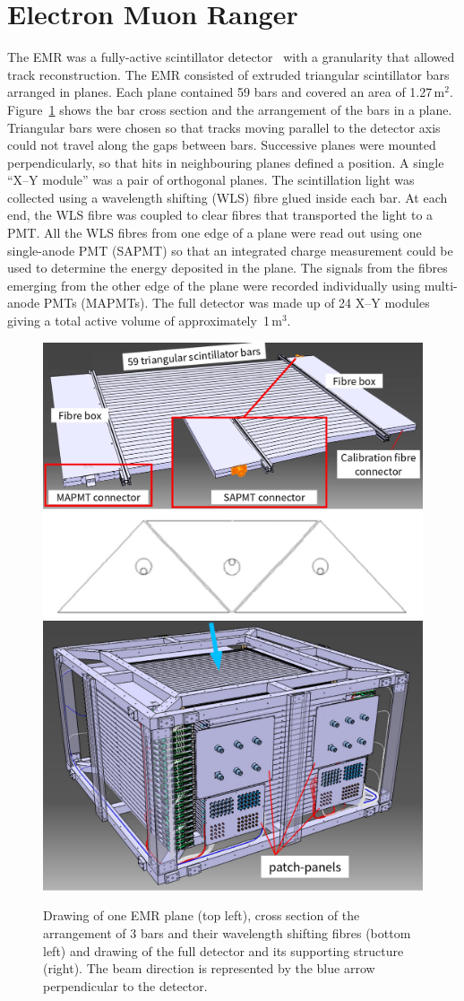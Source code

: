 \graphicspath{{05-EMR/Figures/}}

\section{Electron Muon Ranger}
\label{Sect:EMR}

The EMR was a fully-active scintillator
detector~\cite{2016JInst..11T10007} with a granularity that allowed track reconstruction.
The EMR consisted of extruded triangular scintillator bars arranged in
planes.
Each plane contained 59 bars and covered an area of 1.27\,m$^2$.
Figure~\ref{fig:EMR} shows the bar cross section and the arrangement of the
bars in a plane.
Triangular bars were chosen so that tracks moving parallel to the
detector axis could not travel along the gaps between bars. 
Successive planes were mounted perpendicularly, so
that hits in neighbouring planes defined a position.
A single ``X--Y module'' was a pair of orthogonal planes.
The scintillation light was collected using a wavelength shifting
(WLS) fibre glued inside each bar.
At each end, the WLS fibre was coupled to clear fibres that
transported the light to a PMT.
All the WLS fibres from one edge of a plane were read out using one
single-anode PMT (SAPMT) so that an integrated charge measurement could be
used to determine the energy deposited in the plane.
The signals from the fibres emerging from the other edge of the plane
were recorded individually using multi-anode PMTs (MAPMTs). 
The full detector was made up of 24 X--Y modules giving a total active 
volume of approximately~1\,m$^3$.
\begin{figure}[htb!]
  \begin{center}
    \includegraphics[width=0.465\columnwidth]{EMR1-edited.png}
    \hfill
    \includegraphics[width=0.515\columnwidth]{EMR2-with_beam.png}
  \end{center}
  \caption{
    Drawing of one EMR plane (top left), cross section of the
    arrangement of 3 bars and their wavelength shifting fibres (bottom
    left) and drawing of the full detector and its supporting
    structure (right).
    The beam direction is represented by the blue arrow perpendicular to the detector.
  }
  \label{fig:EMR}
\end{figure}

